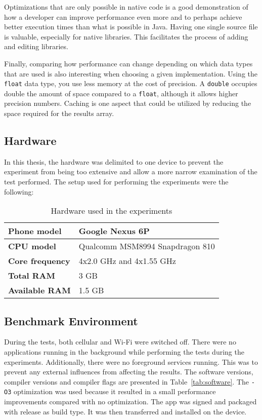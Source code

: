 Optimizations that are only possible in native code is a good demonstration of how a developer can improve performance even more and to perhaps achieve better execution times than what is possible in Java. Having one single source file is valuable, especially for native libraries. This facilitates the process of adding and editing libraries.

Finally, comparing how performance can change depending on which data types that are used is also interesting when choosing a given implementation. Using the \texttt{float} data type, you use less memory at the cost of precision. A \texttt{double} occupies double the amount of space compared to a \texttt{float}, although it allows higher precision numbers. Caching is one aspect that could be utilized by reducing the space required for the results array.

\subsection{Hardware}
In this thesis, the hardware was delimited to one device to prevent the experiment from being too extensive and allow a more narrow examination of the test performed. The setup used for performing the experiments were the following:

\ifrelease
\begin{table}[H]
    \centering
    \label{tab:hardware}
    \caption{Hardware used in the experiments}
    \begin{tabular}{|l|l|}
        \hline
        \textbf{Phone model} & Google Nexus 6P\\
        \hline
        \textbf{CPU model} & Qualcomm MSM8994 Snapdragon 810\\
        \hline
        \textbf{Core frequency} & 4x2.0 GHz and 4x1.55 GHz\\
        \hline
        \textbf{Total RAM} & 3 GB\\
        \hline
        \textbf{Available RAM} & 1.5 GB\\
        \hline
    \end{tabular}
\end{table}
\fi

\subsection{Benchmark Environment}
During the tests, both cellular and Wi-Fi were switched off. There were no applications running in the background while performing the tests during the experiments. Additionally, there were no foreground services running. This was to prevent any external influences from affecting the results. The software versions, compiler versions and compiler flags are presented in Table~\ref{tab:software}. The \texttt{-O3} optimization was used because it resulted in a small performance improvements compared with no optimization. The app was signed and packaged with release as build type. It was then transferred and installed on the device.

